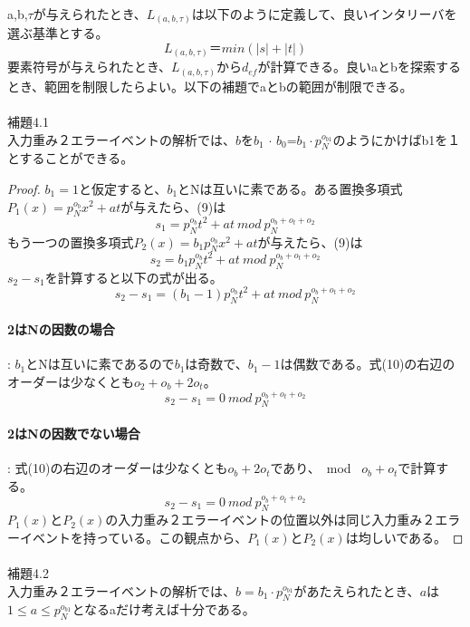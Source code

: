 \documentclass[24 pts]{article}
\begin{document}
\paragraph{}
a,b,$\tau$が与えられたとき、$L_{(a,b,\tau)}$は以下のように定義して、良いインタリーバを選ぶ基準とする。
$$L_{(a,b,\tau)}＝min⁡(|s|+|t|)$$
要素符号が与えられたとき、$L_(a,b,\tau)$から$d_{ef}$が計算できる。良いaとbを探索するとき、範囲を制限したらよい。以下の補題でaとbの範囲が制限できる。
\paragraph{}
補題4.1\\
入力重み２エラーイベントの解析では、$b$を$b_1$ $\cdot$  $b_0$=$b_1 \cdot p_N^{o_{b1}}$のようにかけばb1を１とすることができる。

\begin{proof}
$b_1=1$と仮定すると、$b_1$とNは互いに素である。ある置換多項式$P_1(x)=p_N^{o_b} x^2+at $が与えたら、(9)は$$s_1=p_N^{o_b}t^2 + at \ mod \ p_N^{o_b+o_t+o_2}$$
もう一つの置換多項式$P_2(x)=b_1p_N^{o_b} x^2+at$が与えたら、(9)は
$$s_2=b_1p_N^{o_b}t^2 + at\ mod \ p_N^{o_b+o_t+o_2}$$
$s_2-s_1$を計算すると以下の式が出る。
\begin{equation}\tag{10}
s_2-s_1=(b_1-1)p_N^{o_b}t^2 + at \ mod \ p_N^{o_b+o_t+o_2}
\end{equation}

\paragraph{2はNの因数の場合}:
$b_1$とNは互いに素であるので$b_1$は奇数で、$b_1-1$は偶数である。式(10)の右辺のオーダーは少なくとも$o_2+o_b+2o_t$。
$$s_2-s_1=0 \ mod \ p_N^{o_b+o_t+o_2}$$
\paragraph{2はNの因数でない場合}:
式(10)の右辺のオーダーは少なくとも$o_b+2o_t$であり、\ mod \ $o_b+o_t$で計算する。
$$s_2-s_1=0 \ mod \ p_N^{o_b+o_t+o_2}$$
$P_1(x)$と$P_2(x)$の入力重み２エラーイベントの位置以外は同じ入力重み２エラーイベントを持っている。この観点から、$P_1(x)$と$P_2(x)$は均しいである。
\end{proof}
\paragraph{}
補題4.2\\
入力重み２エラーイベントの解析では、$b= b_1 \cdot p_N^{o_{b1}}$があたえられたとき、$a$は$1\leq a \leq p_N^{o_{b1}}$となるaだけ考えば十分である。
\end{document}
